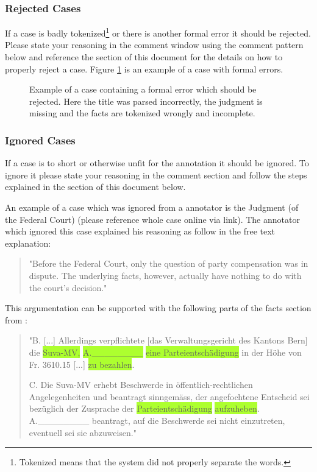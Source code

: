 \documentclass{article}
\begin{document}
\subsubsection{Rejected Cases}
If a case is badly tokenized\footnote{Tokenized means that the system did not properly separate the words.} or there is another formal error it should be rejected. Please state your reasoning in the comment window using the comment pattern below and reference the  section of this document for the details on how to properly reject a case. Figure \ref{reject_case} is an example of a case with formal errors. 
\begin{figure}[H]
     \caption{Example of a case containing a formal error which should be rejected. Here the title was parsed incorrectly, the judgment is missing and the facts are tokenized wrongly and incomplete.}
     \label{reject_case}
\end{figure}

\subsubsection{Ignored Cases}
If a case is to short or otherwise unfit for the annotation it should be ignored. To ignore it please state your reasoning in the comment section and follow the steps explained in the  section of this document below. 

An example of a case which was ignored from a annotator is the Judgment (of the Federal Court) \citeauthor{8C-641-2019} (please reference whole case online via link). The annotator which ignored this case explained his reasoning as follow in the free text explanation: 
\begin{quote}
"Before the Federal Court, only the question of party compensation was in dispute. The underlying facts, however, actually have nothing to do with the court's decision."
\end{quote}
This argumentation can be supported with the following parts of the facts section from \citeauthor{8C-641-2019}:
\begin{quote}
"B. [...] Allerdings verpflichtete [das Verwaltungsgericht des Kantons Bern] die \colorbox{GreenYellow}{Suva-MV,} \colorbox{GreenYellow}{A.\_\_\_\_\_\_\_\_} \colorbox{GreenYellow}{eine Parteientschädigung} in der Höhe
von Fr. 3610.15 [...]  \colorbox{GreenYellow}{zu bezahlen}.

C. Die Suva-MV erhebt Beschwerde in öffentlich-rechtlichen Angelegenheiten und beantragt sinngemäss, der angefochtene Entscheid sei bezüglich der Zusprache der \colorbox{GreenYellow}{Parteientschädigung} \colorbox{GreenYellow}{aufzuheben}.
A.\_\_\_\_\_\_\_\_ beantragt, auf die Beschwerde sei nicht einzutreten, eventuell sei sie abzuweisen."
\end{quote}
\end{document}
